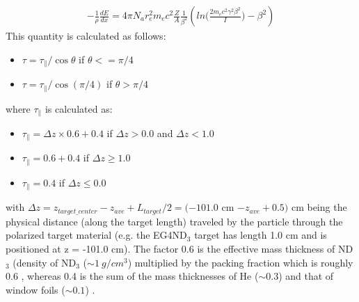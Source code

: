 \begin{eqnarray}
\label{eqBetheBlock}
-\frac{1}{\rho} \frac{dE}{dx} = 4\pi N_a r_e^2 m_e c^2 \frac{Z}{A} \frac{1}{\beta^2} \left( ln\bigg( \frac{2m_ec^2\gamma^2\beta^2}{I} \bigg) - \beta^2 \right) 
\end{eqnarray}
This quantity is calculated as follows:
\begin{itemize}
\item $\tau = \tau_{\parallel}/\cos\theta$ \quad if $\theta <= \pi/4$
\item $\tau = \tau_{\parallel}/\cos(\pi/4)$ \quad if $\theta > \pi/4$    %
\end{itemize}
where $\tau_{\parallel}$ is calculated as:
\begin{itemize}
\item $\tau_{\parallel} = \Delta z \times 0.6 + 0.4$ \quad if $\Delta z > 0.0 $ and $\Delta z < 1.0 $
\item $\tau_{\parallel} = 0.6 + 0.4$ \quad if $\Delta z \geq  1.0$
\item $\tau_{\parallel} = 0.4$ \quad if $\Delta z \leq  0.0$
\end{itemize}
with $\Delta z = z_{target\_center} - z_{ave} + L_{target}/2 = (-101.0$ cm $ - z_{ave} + 0.5)$ cm being the physical distance (along the target length) traveled by the particle through the polarized target material (e.g. the EG4ND$_3$ target has length 1.0 cm and is positioned at z = -101.0 cm). The factor 0.6 is the effective mass thickness of ND$_3$ (density of ND$_3$ ($\sim 1 ~g/cm^3$) %
multiplied by the packing fraction which is roughly 0.6 \cite{rferschAnaNote},%
whereas 0.4 is the sum of the mass thicknesses of He ($\sim 0.3$) and that of window foils ($\sim 0.1$) \cite{nGuler_th}. %


    
